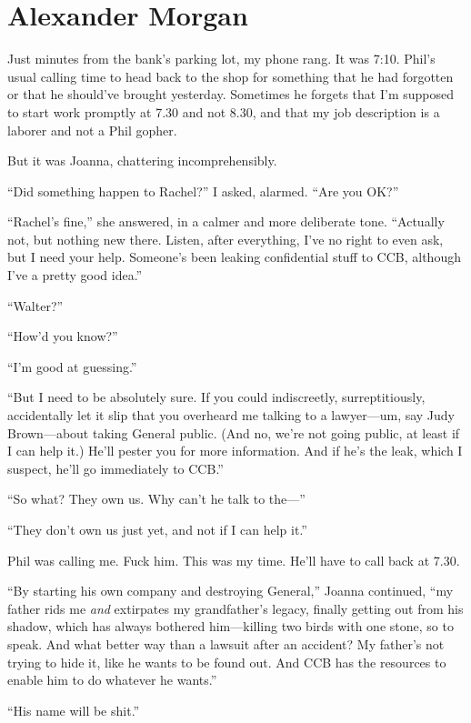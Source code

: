\chapter{Alexander Morgan}

\titlemark

Just minutes from the bank's parking lot, my phone rang. It was 7:10.
Phil's usual calling time to head back to the shop for something that he
had forgotten or that he should've brought yesterday. Sometimes he
forgets that I'm supposed to start work promptly at 7.30 and not 8.30,
and that my job description is a laborer and not a Phil gopher.

But it was Joanna, chattering incomprehensibly.

``Did something happen to Rachel?'' I asked, alarmed. ``Are you OK?''

``Rachel's fine,'' she answered, in a calmer and more deliberate tone.
``Actually not, but nothing new there. Listen, after everything, I've no
right to even ask, but I need your help. Someone's been leaking
confidential stuff to CCB, although I've a pretty good idea.''

``Walter?''

``How'd you know?''

``I'm good at guessing.''

``But I need to be absolutely sure. If you could indiscreetly,
surreptitiously, accidentally let it slip that you overheard me talking
to a lawyer---um, say Judy Brown---about taking General public. (And no,
we're not going public, at least if I can help it.) He'll pester you for
more information. And if he's the leak, which I suspect, he'll go
immediately to CCB.''

``So what? They own us. Why can't he talk to the---''

``They don't own us just yet, and not if I can help it.''

Phil was calling me. Fuck him. This was my time. He'll have to call back
at 7.30.

``By starting his own company and destroying General,'' Joanna
continued, ``my father rids me \emph{and} extirpates my grandfather's
legacy, finally getting out from his shadow, which has always bothered
him---killing two birds with one stone, so to speak. And what better way
than a lawsuit after an accident? My father's not trying to hide it,
like he wants to be found out. And CCB has the resources to enable him
to do whatever he wants.''

``His name will be shit.''

